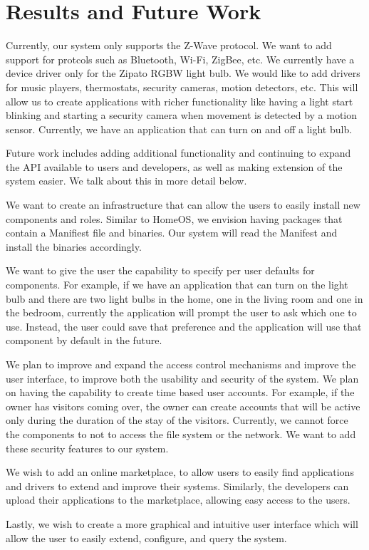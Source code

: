 \section{Results and Future Work}
\label{sec:future}
Currently, our system only supports the Z-Wave protocol. We want
to add support for protcols such as Bluetooth, Wi-Fi, ZigBee, etc. We currently
have a device driver only for the Zipato RGBW light bulb. We would like to add
drivers for music players, thermostats, security cameras, motion detectors, etc.
This will allow us to create applications with richer functionality like having
a light start blinking and starting a security camera when movement is detected
by a motion sensor. Currently, we have an application that can turn on and off a
light bulb.

Future work includes adding additional functionality and continuing to expand
the API available to users and developers, as well as making extension of the
system easier. We talk about this in more detail below.

We want to create an infrastructure that can allow the users to easily install
new components and roles. Similar to HomeOS, we envision having packages that
contain a Manifiest file and binaries. Our system will read the Manifest and
install the binaries accordingly.

We want to give the user the capability to specify per user defaults for
components. For example, if we have an application that can turn on the light
bulb and there are two light bulbs in the home, one in the living room and one
in the bedroom, currently the application will prompt the user to ask which one
to use. Instead, the user could save that preference and the application will
use that component by default in the future.

We plan to improve and expand the access control mechanisms and improve the user
interface, to improve both the usability and security of the system. We plan on
having the capability to create time based user accounts. For example, if the
owner has visitors coming over, the owner can create accounts that will be
active only during the duration of the stay of the visitors. Currently, we
cannot force the components to not to access the file system or the network. We
want to add these security features to our system.

We wish to add an online marketplace, to allow users to easily find applications
and drivers to extend and improve their systems. Similarly, the developers can
upload their applications to the marketplace, allowing easy access to the users.

Lastly, we wish to create a more graphical and intuitive user interface which
will allow the user to easily extend, configure, and query the system.
